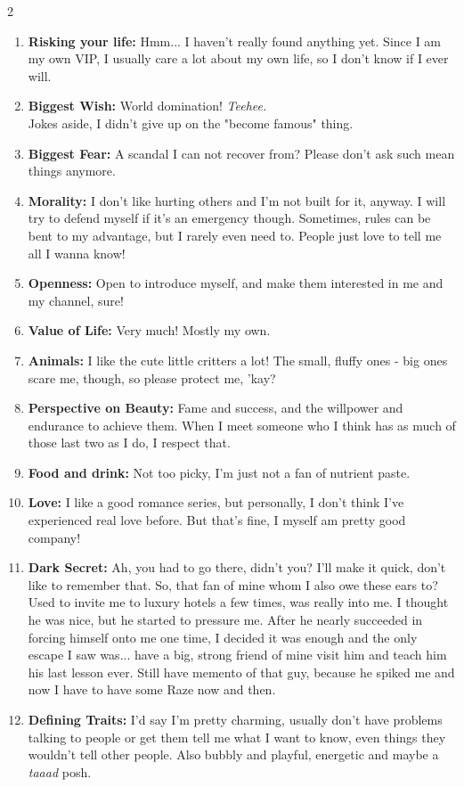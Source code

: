 \begin{multicols}{2}
\begin{enumerate}
	\item
	\textbf{Risking your life:}
	Hmm... I haven't really found anything yet.
	Since I am my own VIP,
	I usually care a lot about my own life,
	so I don't know if I ever will.
	\item
	\textbf{Biggest Wish:}
	World domination! \emph{Teehee.}
	\\%
	Jokes aside, I didn't give up on the "become famous" thing.
	\item
	\textbf{Biggest Fear:}
	A scandal I can not recover from?
	Please don't ask such mean things anymore.
	\item
	\textbf{Morality:}
	I don't like hurting others and I'm not built for it, anyway.
	I will try to defend myself if it's an emergency though.
	Sometimes, rules can be bent to my advantage,
 	but I rarely even need to.
  	People just love to tell me all I wanna know! 
	\item
	\textbf{Openness:}
	Open to introduce myself,
	and make them interested in me and my channel, sure!
	\item
	\textbf{Value of Life:}
	Very much!
	Mostly my own.
	\item
	\textbf{Animals:}
	I like the cute little critters a lot!
	The small, fluffy ones
	- big ones scare me, though,
	so please protect me, 'kay?
	\item
	\textbf{Perspective on Beauty:}
	Fame and success,
	and the willpower and endurance to achieve them.
	When I meet someone who I think has as much of those last two as I do,
	I respect that.
	\item
	\textbf{Food and drink:}
	Not too picky, I'm just not a fan of nutrient paste.
	\item
	\textbf{Love:}
	I like a good romance series, but personally,
	I don't think I've experienced real love before.
	But that's fine, I myself am pretty good company!
	\item
	\textbf{Dark Secret:}
	Ah, you had to go there, didn't you? I'll make it quick, don't like to remember that.
	So, that fan of mine whom I also owe these ears to?
	Used to invite me to luxury hotels a few times, was really into me.
	I thought he was nice, but he started to pressure me.
	After he nearly succeeded in forcing himself onto me one time,
	I decided it was enough and the only escape I saw was...
	have a big, strong friend of mine visit him and teach him his last lesson ever.
	Still have memento of that guy, because he spiked me and now I have to have some Raze now and then.
	\item
	\textbf{Defining Traits:}
	I'd say I'm pretty charming,
	usually don't have problems talking to people
	or get them tell me what I want to know,
	even things they wouldn't tell other people.
	Also bubbly and playful,
	energetic and maybe a \emph{taaad} posh.
\end{enumerate}
\end{multicols}

